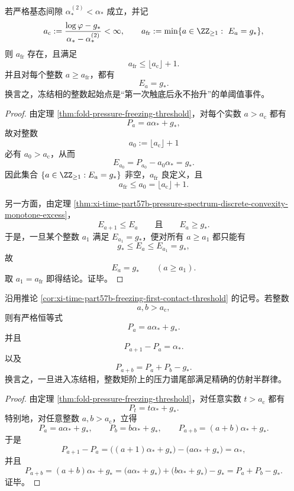 \begin{corollary}[冻结相整数起始点的单阈值刚性]\label{cor:xi-time-part57b-freezing-first-contact-threshold}
若严格基态间隙 \(\alpha_*^{(2)}<\alpha_*\) 成立，并记
\[
a_{\mathrm c}:=\frac{\log\varphi-g_*}{\alpha_*-\alpha_*^{(2)}}<\infty,
\qquad
a_{\mathrm{fr}}:=\min\{a\in\ZZ_{\ge 1}:\ E_a=g_*\},
\]
则 \(a_{\mathrm{fr}}\) 存在，且满足
\[
\boxed{\;a_{\mathrm{fr}}\le \lfloor a_{\mathrm c}\rfloor+1.\;}
\]
并且对每个整数 \(a\ge a_{\mathrm{fr}}\)，都有
\[
\boxed{\;E_a=g_*.\;}
\]
换言之，冻结相的整数起始点是“第一次触底后永不抬升”的单阈值事件。
\end{corollary}
\begin{proof}
由定理 \ref{thm:fold-pressure-freezing-threshold}，对每个实数 \(a>a_{\mathrm c}\) 都有
\[
P_a=a\alpha_*+g_*,
\]
故对整数
\[
a_0:=\lfloor a_{\mathrm c}\rfloor+1
\]
必有 \(a_0>a_{\mathrm c}\)，从而
\[
E_{a_0}=P_{a_0}-a_0\alpha_*=g_*.
\]
因此集合 \(\{a\in\ZZ_{\ge 1}:E_a=g_*\}\) 非空，\(a_{\mathrm{fr}}\) 良定义，且
\[
a_{\mathrm{fr}}\le a_0=\lfloor a_{\mathrm c}\rfloor+1.
\]

另一方面，由定理 \ref{thm:xi-time-part57b-pressure-spectrum-discrete-convexity-monotone-excess}，
\[
E_{a+1}\le E_a
\qquad\text{且}\qquad
E_a\ge g_*.
\]
于是，一旦某个整数 \(a_1\) 满足 \(E_{a_1}=g_*\)，便对所有 \(a\ge a_1\) 都只能有
\[
g_*\le E_a\le E_{a_1}=g_*,
\]
故
\[
E_a=g_*
\qquad(a\ge a_1).
\]
取 \(a_1=a_{\mathrm{fr}}\) 即得结论。证毕。
\end{proof}

\begin{corollary}[冻结相整数矩阶尾部的精确仿射半群律]\label{cor:xi-time-part57b-pressure-affine-semigroup-law}
沿用推论 \ref{cor:xi-time-part57b-freezing-first-contact-threshold} 的记号。若整数
\[
a,b>a_{\mathrm c},
\]
则有严格恒等式
\[
\boxed{\;P_a=a\alpha_*+g_*.\;}
\]
并且
\[
\boxed{\;P_{a+1}-P_a=\alpha_*.\;}
\]
以及
\[
\boxed{\;P_{a+b}=P_a+P_b-g_*.\;}
\]
换言之，一旦进入冻结相，整数矩阶上的压力谱尾部满足精确的仿射半群律。
\end{corollary}
\begin{proof}
由定理 \ref{thm:fold-pressure-freezing-threshold}，对任意实数 \(t>a_{\mathrm c}\) 都有
\[
P_t=t\alpha_*+g_*.
\]
特别地，对任意整数 \(a,b>a_{\mathrm c}\)，立得
\[
P_a=a\alpha_*+g_*,
\qquad
P_b=b\alpha_*+g_*,
\qquad
P_{a+b}=(a+b)\alpha_*+g_*.
\]
于是
\[
P_{a+1}-P_a
=
\bigl((a+1)\alpha_*+g_*\bigr)-\bigl(a\alpha_*+g_*\bigr)
=
\alpha_*,
\]
并且
\[
P_{a+b}
=
(a+b)\alpha_*+g_*
=
\bigl(a\alpha_*+g_*\bigr)+\bigl(b\alpha_*+g_*\bigr)-g_*
=
P_a+P_b-g_*.
\]
证毕。
\end{proof}

